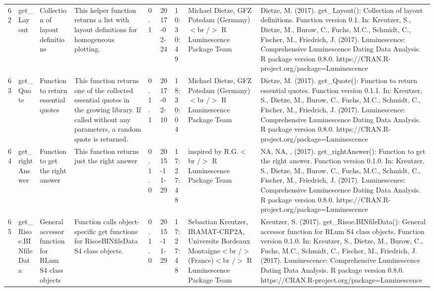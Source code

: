 \begin{table}[ht]
\begin{tabular}{rllllllll}
  62 & get\_Layout & Collection of layout definitions & This helper function returns a list with layout definitions for homogeneous plotting. & 0.1 & 2017-02-24 & 10:30:49
 & Michael Dietze, GFZ Potsdam (Germany)$<$br /$>$  R Luminescence Package Team & Dietze, M. (2017). get\_Layout(): Collection of layout definitions. Function version 0.1. In: Kreutzer, S., Dietze, M., Burow, C., Fuchs, M.C., Schmidt, C., Fischer, M., Friedrich, J. (2017). Luminescence: Comprehensive Luminescence Dating Data Analysis. R package version 0.8.0. https://CRAN.R-project.org/package=Luminescence
 \\ 
  63 & get\_Quote & Function to return essential quotes & This function returns one of the collected essential quotes in the growing library. If called without any parameters, a random quote is returned. & 0.1.1 & 2017-02-10 & 18:30:04
 & Michael Dietze, GFZ Potsdam (Germany)$<$br /$>$  R Luminescence Package Team & Dietze, M. (2017). get\_Quote(): Function to return essential quotes. Function version 0.1.1. In: Kreutzer, S., Dietze, M., Burow, C., Fuchs, M.C., Schmidt, C., Fischer, M., Friedrich, J. (2017). Luminescence: Comprehensive Luminescence Dating Data Analysis. R package version 0.8.0. https://CRAN.R-project.org/package=Luminescence
 \\ 
  64 & get\_rightAnswer & Function to get the right answer & This function returns just the right answer & 0.1.0 & 2015-11-29 & 17:27:48
 & inspired by R.G.$<$br /$>$  R Luminescence Package Team & NA, NA, ,  (2017). get\_rightAnswer(): Function to get the right answer. Function version 0.1.0. In: Kreutzer, S., Dietze, M., Burow, C., Fuchs, M.C., Schmidt, C., Fischer, M., Friedrich, J. (2017). Luminescence: Comprehensive Luminescence Dating Data Analysis. R package version 0.8.0. https://CRAN.R-project.org/package=Luminescence
 \\ 
  65 & get\_Risoe.BINfileData & General accessor function for RLum S4 class objects & Function calls object-specific get functions for RisoeBINfileData S4 class objects. & 0.1.0 & 2015-11-29 & 17:27:48
 & Sebastian Kreutzer, IRAMAT-CRP2A, Universite Bordeaux Montaigne$<$br /$>$ (France)$<$br /$>$  R Luminescence Package Team & Kreutzer, S. (2017). get\_Risoe.BINfileData(): General accessor function for RLum S4 class objects. Function version 0.1.0. In: Kreutzer, S., Dietze, M., Burow, C., Fuchs, M.C., Schmidt, C., Fischer, M., Friedrich, J. (2017). Luminescence: Comprehensive Luminescence Dating Data Analysis. R package version 0.8.0. https://CRAN.R-project.org/package=Luminescence
 \\ 

\end{tabular}
\end{table}
